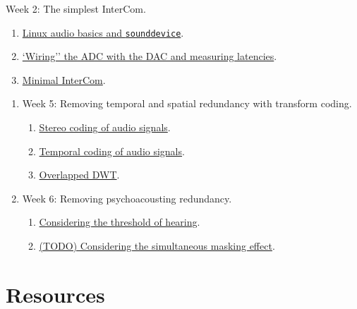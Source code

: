 \item Week 2: The simplest InterCom.
\begin{enumerate}
\item \href{https://tecnologias-multimedia.github.io/study_guide/Linux_audio/}{Linux audio basics and \texttt{sounddevice}}.
\item \href{https://tecnologias-multimedia.github.io/study_guide/04-wiring/}{`Wiring'' the ADC with the DAC and measuring latencies}.
\item \href{https://tecnologias-multimedia.github.io/study_guide/05-minimal/}{Minimal InterCom}.
\end{enumerate}

\begin{enumerate}
\item Week 5: Removing temporal and spatial redundancy with transform coding.
\begin{enumerate}
\item \href{https://tecnologias-multimedia.github.io/study_guide/11-stereo_coding/}{Stereo coding of audio signals}.
\item \href{https://tecnologias-multimedia.github.io/study_guide/12-temporal_coding/}{Temporal coding of audio signals}.
\item \href{https://tecnologias-multimedia.github.io/study_guide/13-overlapped_temporal_coding/}{Overlapped DWT}.
\end{enumerate}
\item Week 6: Removing psychoacousting redundancy.
\begin{enumerate}
\item \href{https://tecnologias-multimedia.github.io/study_guide/14-threshold_of_hearing/}{Considering the threshold of hearing}.
\item \href{https://tecnologias-multimedia.github.io/study_guide/15-simultaneous_masking/}{(TODO) Considering the simultaneous masking effect}.
\end{enumerate}
\end{enumerate}

\section{Resources}



